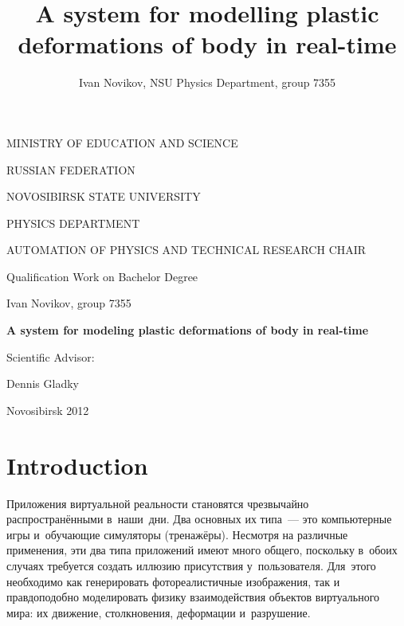 \documentclass[a4paper, 12pt, titlepage]{extarticle}
\author{Ivan Novikov, NSU Physics Department, group 7355}
\title{A system for modelling plastic deformations of body in real-time}
\newenvironment{firstpage}%
    {\thispagestyle{empty} \begin{center} \large}
    {\end{center} \newpage}
\begin{document}

  \begin{firstpage}
  MINISTRY OF EDUCATION AND SCIENCE

  RUSSIAN FEDERATION

  \vspace{0.3cm}

  NOVOSIBIRSK STATE UNIVERSITY

  \vspace{1.6cm}

  PHYSICS DEPARTMENT

  \vspace {0.5cm}

  AUTOMATION OF PHYSICS AND TECHNICAL RESEARCH CHAIR

  \vspace {5cm}

  Qualification Work on Bachelor Degree

  \vspace {1cm}

  Ivan Novikov, group 7355

  \vspace {1.5cm}

  \textbf{A system for modeling plastic deformations of body in real-time}

  \vspace {1.5cm}

  \begin{flushright}

    Scientific Advisor:

    Dennis Gladky

  \end{flushright}

  \vspace {6cm}

  Novosibirsk 2012
  \end{firstpage}


  \tableofcontents
  \newpage
  \setlength{\parskip}{1ex}

  \section{Introduction}

\begin{original}
    Приложения виртуальной реальности становятся чрезвычайно рас\-прос\-тра\-нён\-ны\-ми в~наши~дни.  Два
    основных их типа~--- это компьютерные игры и~обучающие симуляторы (тренажёры). Несмотря на
    различные применения, эти два типа приложений имеют много общего, поскольку в~обоих случаях
    требуется создать иллюзию присутствия у~пользователя. Для~этого необходимо как генерировать
    фотореалистичные изображения, так и правдоподобно моделировать физику взаимодействия объектов
    виртуального мира: их движение, столкновения, деформации и~разрушение.
\end{original}
\end{document}
